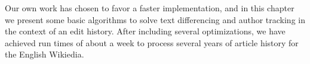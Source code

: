 
Our own work has chosen to favor a faster implementation, and
in this chapter we present some basic algorithms to solve text
differencing and author tracking in the context of an edit history.
After including several optimizations, we have achieved run times
of about a week to process several years of article history for
the English Wikiedia.

